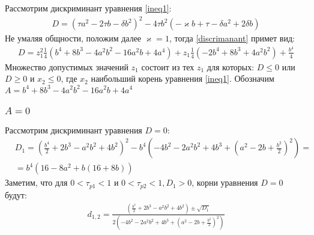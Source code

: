 \documentclass[a4paper]{article}
\begin{document}
Рассмотрим дискриминант уравнения \ref{ineq1}:
\begin{equation}\label{discrimanant}
 \begin{aligned}
D = (\tau a^2-2 \tau b - \delta b^2)^2 - 4\tau b^2 (-\varkappa b+\tau-\delta a^2 + 2\delta b)
 \end{aligned}
\end{equation} 
Не умаляя общности, положим далее $\varkappa = 1$, тогда \ref{discrimanant} примет вид:
\begin{equation}\label{discrimanant_transformed}
 \begin{aligned}
D = z_1^2\frac{1}{4}(b^4 + 8 b^3 - 4 a^2 b^2 - 16 a^2 b + 4 a^4 )+z_1\frac{1}{4}(- 2 b^4 + 8 b^3 + 4 a^2 b^2) + \frac{b^4}{4}
 \end{aligned}
\end{equation}
Множество допустимых значений $z_1$ состоит из тех $z_1$ для которых:   $D \leq 0$ или $D \geq 0$ и $x_2 \leq 0$, где $x_2$ наибольший корень уравнения \ref{ineq1}. Обозначим $A = b^4 + 8 b^3 - 4 a^2 b^2 - 16 a^2 b + 4 a^4$
\subsubsection{$A  = 0$}
Рассмотрим дискриминант уравнения $D = 0$:
\begin{equation}\label{discrimanant1}
 \begin{aligned}
&D_1 = (\frac{b^4}{2}+2b^3-a^2b^2+4b^2)^2-b^4(-4b^2-2a^2b^2+4b^3+(a^2-2b+\frac{b^2}{2})^2) =\\
&= b^4(16 - 8a^2 + b(16 + 8b))
 \end{aligned}
\end{equation}
Заметим, что для $0 < \tau_{p1} < 1$ и $0 < \tau_{p2} < 1,  D_1 > 0$, корни уравнения $D = 0$ будут:
\begin{equation}
 \begin{aligned}
d_{1,2} = \frac{(\frac{b^4}{2}+2b^3-a^2b^2+4b^2)\pm\sqrt{D_1}}{2(-4b^2-2a^2b^2+4b^3+(a^2-2b+\frac{b^2}{2})^2)}
 \end{aligned}
\end{equation}
\end{document}
